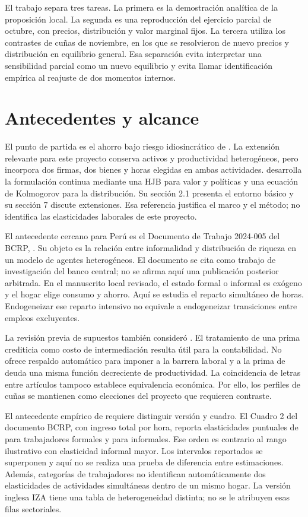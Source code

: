 \documentclass[11pt]{article}
\theoremstyle{definition}
\begin{document}
El trabajo separa tres tareas. La primera es la demostración analítica de la proposición local. La segunda es una reproducción del ejercicio parcial de octubre, con precios, distribución y valor marginal fijos. La tercera utiliza los contrastes de cuñas de noviembre, en los que se resolvieron de nuevo precios y distribución en equilibrio general. Esa separación evita interpretar una sensibilidad parcial como un nuevo equilibrio y evita llamar identificación empírica al reajuste de dos momentos internos.

\section{Antecedentes y alcance}
El punto de partida es el ahorro bajo riesgo idiosincrático de \citet{Aiyagari1994}. La extensión relevante para este proyecto conserva activos y productividad heterogéneos, pero incorpora dos firmas, dos bienes y horas elegidas en ambas actividades. \citet{Achdou2022} desarrolla la formulación continua mediante una HJB para valor y políticas y una ecuación de Kolmogorov para la distribución. Su sección 2.1 presenta el entorno básico y su sección 7 discute extensiones. Esa referencia justifica el marco y el método; no identifica las elasticidades laborales de este proyecto.

El antecedente cercano para Perú es el Documento de Trabajo 2024-005 del BCRP, \citet{Galindo2024}. Su objeto es la relación entre informalidad y distribución de riqueza en un modelo de agentes heterogéneos. El documento se cita como trabajo de investigación del banco central; no se afirma aquí una publicación posterior arbitrada. En el manuscrito local revisado, el estado formal o informal es exógeno y el hogar elige consumo y ahorro. Aquí se estudia el reparto simultáneo de horas. Endogeneizar ese reparto intensivo no equivale a endogeneizar transiciones entre empleos excluyentes.

La revisión previa de supuestos también consideró \citet{Kaplan2018}. El tratamiento de una prima crediticia como costo de intermediación resulta útil para la contabilidad. No ofrece respaldo automático para imponer a la barrera laboral y a la prima de deuda una misma función decreciente de productividad. La coincidencia de letras entre artículos tampoco establece equivalencia económica. Por ello, los perfiles de cuñas se mantienen como elecciones del proyecto que requieren contraste.

El antecedente empírico de \citet{CespedesRendon2012} requiere distinguir versión y cuadro. El Cuadro 2 del documento BCRP, con ingreso total por hora, reporta elasticidades puntuales de \EmpiricalPhiFormal{} para trabajadores formales y \EmpiricalPhiInformal{} para informales. Ese orden es contrario al rango ilustrativo con elasticidad informal mayor. Los intervalos reportados se superponen y aquí no se realiza una prueba de diferencia entre estimaciones. Además, categorías de trabajadores no identifican automáticamente dos elasticidades de actividades simultáneas dentro de un mismo hogar. La versión inglesa IZA tiene una tabla de heterogeneidad distinta; no se le atribuyen esas filas sectoriales.
\end{document}
